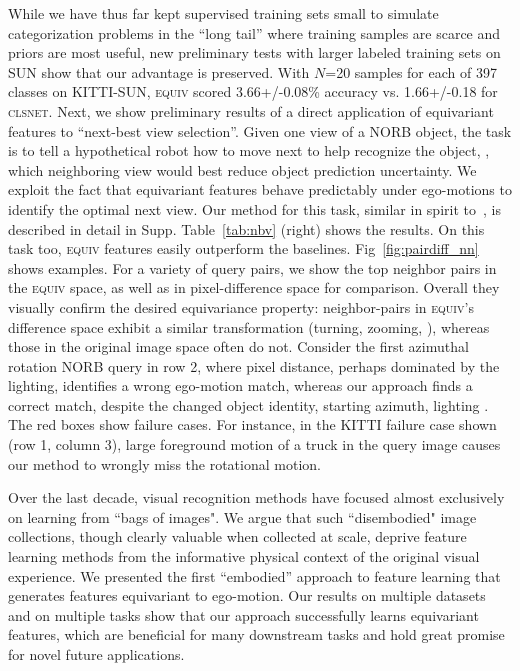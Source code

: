 \documentclass[10pt,twocolumn,letterpaper]{article}
\newcommand{\newchanges}{}
\newcommand{\changes}{}
\begin{document}
\newchanges{While we have thus far kept supervised training sets small to simulate categorization problems in the ``long tail'' where training samples are scarce and priors are most useful, new preliminary tests with larger labeled training sets on SUN show that our advantage is preserved. With $N$=20 samples for each of 397 classes on KITTI-SUN, \textsc{equiv} scored 3.66+/-0.08\% accuracy vs. 1.66+/-0.18 for \textsc{clsnet}.}%
Next, we show preliminary results of a direct application of equivariant features to ``next-best view selection''. Given one view of a NORB object, the task is to tell a hypothetical robot how to move next to help recognize the object, \ie, which neighboring view would best reduce object prediction uncertainty. We exploit the fact that equivariant features behave predictably under ego-motions to identify the optimal next view. Our method for this task, similar in \changes{spirit} to~\cite{wu20143d}, is described in detail in Supp. Table~\ref{tab:nbv} (right) shows the results. On this task too, \textsc{equiv} features easily outperform the baselines.
Fig~\ref{fig:pairdiff_nn} shows examples.  For a variety of query pairs, we show the top neighbor pairs in the \textsc{equiv} space, as well as in pixel-difference space for comparison.  Overall they visually confirm the desired equivariance property: neighbor-pairs in \textsc{equiv}'s difference space exhibit a similar transformation (turning, zooming, \etc), whereas those in the original image space often do not. Consider the first azimuthal rotation NORB query in row 2, where pixel distance, perhaps dominated by the lighting, identifies a wrong ego-motion match, whereas our approach finds a correct match, despite the changed object identity, starting azimuth, lighting \etc. The red boxes show failure cases. For instance, in the KITTI failure case shown (row 1, column 3), large foreground motion of a truck in the query image causes our method to wrongly miss the rotational motion.

Over the last decade, visual recognition methods have focused almost exclusively on learning from \newchanges{``bags of images".  We argue that} such ``disembodied" image collections, though clearly valuable when collected at scale, deprive feature learning methods from the informative physical context of the original visual experience.  We presented the first ``embodied'' approach to feature learning that generates features equivariant to ego-motion. Our results on multiple datasets and on multiple tasks show that our approach successfully learns equivariant features, which are beneficial for many downstream tasks and hold great promise for novel future applications.
\end{document}
